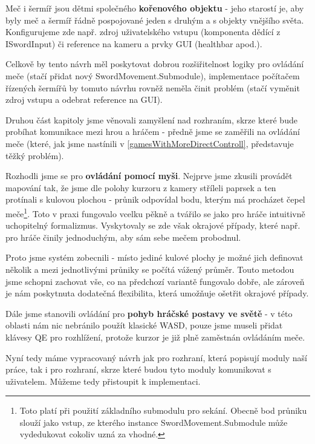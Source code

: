Meč i šermíř jsou dětmi společného \textbf{kořenového objektu} - jeho starostí je, aby byly meč a šermíř řádně pospojované jeden s druhým a s objekty vnějšího světa. Konfigurujeme zde např. zdroj uživatelského vstupu (komponenta dědící z ISwordInput) či reference na kameru a prvky GUI (healthbar apod.).

Celkově by tento návrh měl poskytovat dobrou rozšiřitelnost logiky pro ovládání meče (stačí přidat nový SwordMovement.Submodule), implementace počítačem řízených šermířů by tomuto návrhu rovněž neměla činit problém (stačí vyměnit zdroj vstupu a odebrat reference na GUI).

\bigbreak

Druhou část kapitoly jsme věnovali zamyšlení nad rozhraním, skrze které bude probíhat komunikace mezi hrou a hráčem - předně jsme se zaměřili na ovládání meče (které, jak jsme nastínili v \ref{gamesWithMoreDirectControll}, představuje těžký problém).

Rozhodli jsme se pro \textbf{ovládání pomocí myši}. Nejprve jsme zkusili provádět mapování tak, že jsme dle polohy kurzoru z kamery stříleli paprsek a ten protínali s kulovou plochou - průnik odpovídal bodu, kterým má procházet čepel meče\footnote{Toto platí při použití základního submodulu pro sekání. Obecně bod průniku slouží jako vstup, ze kterého instance SwordMovement.Submodule může vydedukovat cokoliv uzná za vhodné.}. Toto v praxi fungovalo vcelku pěkně a tvářilo se jako pro hráče intuitivně uchopitelný formalizmus. Vyskytovaly se zde však okrajové případy, které např. pro hráče činily jednoduchým, aby sám sebe mečem probodnul.

Proto jsme systém zobecnili - místo jediné kulové plochy je možné jich definovat několik a mezi jednotlivými průniky se počítá vážený průměr. Touto metodou jsme schopni zachovat vše, co na předchozí variantě fungovalo dobře, ale zároveň je nám poskytnuta dodatečná flexibilita, která umožňuje ošetřit okrajové případy.

Dále jsme stanovili ovládání pro \textbf{pohyb hráčské postavy ve světě} - v této oblasti nám nic nebránilo použít klasické WASD, pouze jsme museli přidat klávesy QE pro rozhlížení, protože kurzor je již plně zaměstnán ovládáním meče.

\bigbreak
Nyní tedy máme vypracovaný návrh jak pro rozhraní, která popisují moduly naší práce, tak i pro rozhraní, skrze které budou tyto moduly komunikovat s uživatelem. Můžeme tedy přistoupit k implementaci.